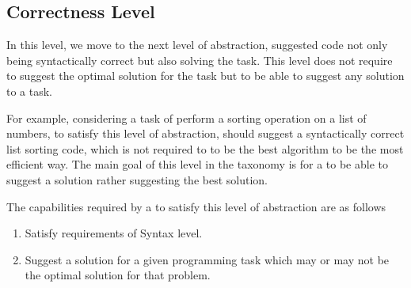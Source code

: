 \subsection{Correctness Level}
\label{correctness}
In this level, we move to the next level of abstraction, suggested code not only being syntactically correct but also solving the task. This level does not require \cct{} to suggest the optimal solution for the task but to be able to suggest any solution to a task.

For example, considering a task of perform a sorting operation on a list of numbers, to satisfy this level of abstraction, \cct{} should suggest a syntactically correct list sorting code, which is not required to to be the best algorithm to be the most efficient way. The main goal of this level in the taxonomy is for a \cct{} to be able to suggest a solution rather suggesting the best solution.

The capabilities required by a \cct{} to satisfy this level of abstraction are as follows
\begin{enumerate}
    \item Satisfy requirements of Syntax level.
    \item Suggest a solution for a given programming task which may or may not be the optimal solution for that problem.
\end{enumerate}